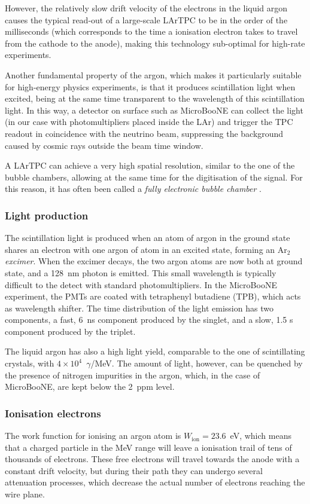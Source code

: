 However, the relatively slow drift velocity of the electrons in the liquid argon causes the typical read-out of a large-scale LArTPC to be in the order of the milliseconds (which corresponds to the time a ionisation electron takes to travel from the cathode to the anode), making this technology sub-optimal for high-rate experiments. 

Another fundamental property of the argon, which makes it particularly suitable for high-energy physics experiments, is that it produces scintillation light when excited, being at the same time transparent to the wavelength of this scintillation light. In this way, a detector on surface such as MicroBooNE can collect the light (in our case with photomultipliers placed inside the LAr) and trigger the TPC readout in coincidence with the neutrino beam, suppressing the background caused by cosmic rays outside the beam time window. 

A LArTPC can achieve a very high spatial resolution, similar to the one of the bubble chambers, allowing at the same time for the digitisation of the signal. For this reason, it has often been called a \emph{fully electronic bubble chamber} \cite{Rubbia:2011zza}. 

\subsubsection{Light production}
The scintillation light is produced when an atom of argon in the ground state shares an electron with one argon of atom in an excited state, forming an Ar$_{2}$ \emph{excimer}. When the excimer decays, the two argon atoms are now both at ground state, and a 128~nm photon is emitted. This small wavelength is typically difficult to the detect with standard photomultipliers. In the MicroBooNE experiment, the PMTs are coated with tetraphenyl butadiene (TPB), which acts as wavelength shifter. The time distribution of the light emission has two components, a fast, 6~ns component produced by the singlet, and a slow, 1.5 \si{\micro}s component produced by the triplet. 

The liquid argon has also a high light yield, comparable to the one of scintillating crystals, with $4\times10^4$~$\gamma$/MeV. The amount of light, however, can be quenched by the presence of nitrogen impurities in the argon, which, in the case of MicroBooNE, are kept below the 2~ppm level.

\subsubsection{Ionisation electrons}\label{sec:ionisation}
The work function for ionising an argon atom is $W_{\mathrm{ion}} = 23.6$~eV, which means that a charged particle in the MeV range will leave a ionisation trail of tens of thousands of electrons. These free electrons will travel towards the anode with a constant drift velocity, but during their path they can undergo several attenuation processes, which decrease the actual number of electrons reaching the wire plane. 

